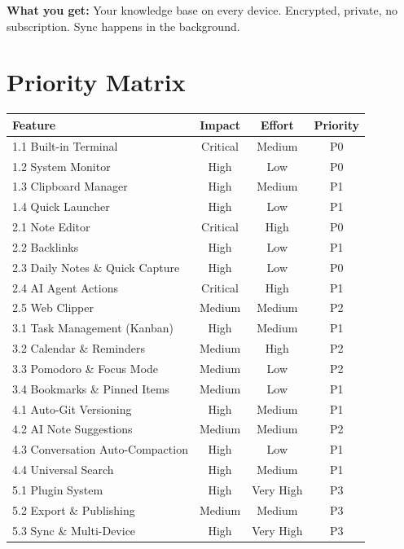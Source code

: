 \documentclass[11pt,a4paper]{article}
\begin{document}
\textbf{What you get:} Your knowledge base on every device. Encrypted, private, no subscription. Sync happens in the background.

\section{Priority Matrix}

\begin{table}[h]
\centering
\small
\begin{tabularx}{\textwidth}{Xccc}
\toprule
\textbf{Feature} & \textbf{Impact} & \textbf{Effort} & \textbf{Priority} \\
\midrule
1.1 Built-in Terminal & Critical & Medium & P0 \\
1.2 System Monitor & High & Low & P0 \\
1.3 Clipboard Manager & High & Medium & P1 \\
1.4 Quick Launcher & High & Low & P1 \\
2.1 Note Editor & Critical & High & P0 \\
2.2 Backlinks & High & Low & P1 \\
2.3 Daily Notes \& Quick Capture & High & Low & P0 \\
2.4 AI Agent Actions & Critical & High & P1 \\
2.5 Web Clipper & Medium & Medium & P2 \\
3.1 Task Management (Kanban) & High & Medium & P1 \\
3.2 Calendar \& Reminders & Medium & High & P2 \\
3.3 Pomodoro \& Focus Mode & Medium & Low & P2 \\
3.4 Bookmarks \& Pinned Items & Medium & Low & P1 \\
4.1 Auto-Git Versioning & High & Medium & P1 \\
4.2 AI Note Suggestions & Medium & Medium & P2 \\
4.3 Conversation Auto-Compaction & High & Low & P1 \\
4.4 Universal Search & High & Medium & P1 \\
5.1 Plugin System & High & Very High & P3 \\
5.2 Export \& Publishing & Medium & Medium & P3 \\
5.3 Sync \& Multi-Device & High & Very High & P3 \\
\bottomrule
\end{tabularx}
\end{table}
\end{document}
